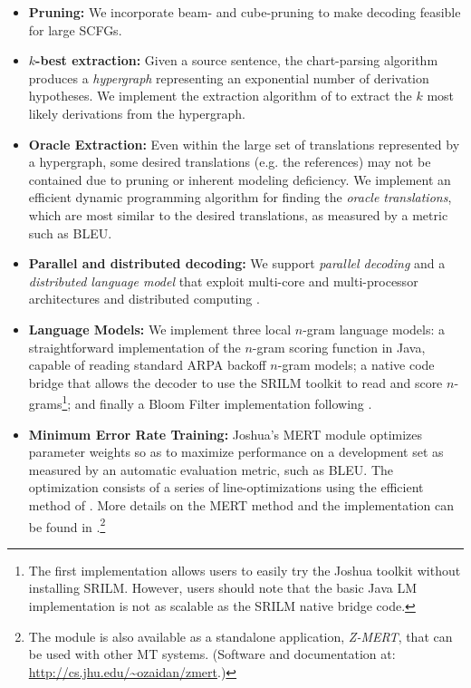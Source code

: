 \documentclass[11pt]{article}
\begin{document}
\begin{itemize}

\item \textbf{Pruning:} We incorporate beam- and cube-pruning \cite{Chiang2007}
to make decoding feasible for large SCFGs.

\item \textbf{$k$-best extraction:}
Given a source sentence, the chart-parsing algorithm produces a \emph{hypergraph}
representing an exponential number of derivation hypotheses.  We implement the
extraction algorithm of  to extract the $k$ most likely
derivations from the hypergraph.

\item \textbf{Oracle Extraction:}
Even within the large set of translations represented by a hypergraph,
some desired translations (e.g. the references)
may not be contained due to pruning or inherent modeling deficiency.
We implement an efficient dynamic programming algorithm \cite{oracleExtraction2009}
for finding the \emph{oracle translations}, which are most similar to the desired translations, as measured by
a metric such as B{\small LEU}.

\item \textbf{Parallel and distributed decoding:}
We support \emph{parallel decoding} and a \emph{distributed language model}
that exploit multi-core and multi-processor architectures and distributed computing
\cite{Li2008b}.

\item \textbf{Language Models:} We implement three local $n$-gram language models:
a straightforward implementation of the $n$-gram scoring function in Java, capable
of reading standard ARPA backoff $n$-gram models;
a native code bridge that allows the decoder to use the SRILM toolkit to
read and score $n$-grams\footnote{The first implementation
allows users to easily try the Joshua toolkit without installing SRILM.
However, users should note that the
basic Java LM implementation is not as scalable as the SRILM native bridge code.};
and finally a Bloom Filter implementation following .

\item \textbf{Minimum Error Rate Training:} Joshua's MERT module optimizes parameter
weights so as to maximize performance on a development set as measured by an automatic
evaluation metric, such as B{\small LEU}.  The optimization consists of a series of
line-optimizations using the efficient method of .  More details on the MERT method
and the implementation can be found in .\footnote{The module
is also available as a standalone application, {\em Z-MERT}, that can be used with other
MT systems.  (Software and documentation at: \url{http://cs.jhu.edu/~ozaidan/zmert}.)}


\end{itemize}
\end{document}
